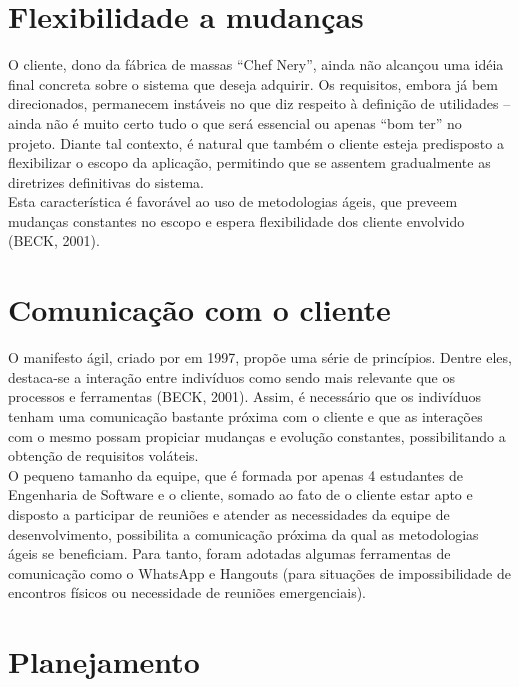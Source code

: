	\large{\section {Flexibilidade a mudanças\\}}

O cliente, dono da fábrica de massas “Chef Nery”, ainda não alcançou uma idéia final concreta sobre o sistema que deseja adquirir. Os requisitos, embora já bem direcionados, permanecem instáveis no que diz respeito à definição de utilidades – ainda não é muito certo tudo o que será essencial ou apenas “bom ter” no projeto. Diante tal contexto, é natural que também o cliente esteja predisposto a flexibilizar o escopo da aplicação, permitindo que se assentem gradualmente as diretrizes definitivas do sistema. \\
\tab Esta característica é favorável ao uso de metodologias ágeis, que preveem mudanças constantes no escopo e espera flexibilidade dos cliente envolvido (BECK, 2001). \\


	\large{\section {Comunicação com o cliente\\}}


\tab O manifesto ágil, criado por  em 1997, propõe uma série de princípios. Dentre eles, destaca-se a interação entre indivíduos como sendo mais relevante que os processos e ferramentas  (BECK, 2001). Assim,  é necessário que os indivíduos tenham uma comunicação bastante próxima  com o cliente e que as interações com o mesmo possam propiciar mudanças e evolução constantes, possibilitando  a obtenção de requisitos voláteis. \\
\tab O pequeno tamanho da equipe, que é formada por apenas 4 estudantes de Engenharia de Software e o cliente, somado ao fato de o cliente estar apto e disposto a participar de reuniões e atender as necessidades da equipe de desenvolvimento, possibilita a comunicação próxima da qual as metodologias ágeis se beneficiam. Para tanto, foram adotadas algumas ferramentas de comunicação como o WhatsApp e Hangouts (para situações de impossibilidade de encontros físicos ou necessidade de reuniões emergenciais). \\

	\large{\section {Planejamento\\}}


